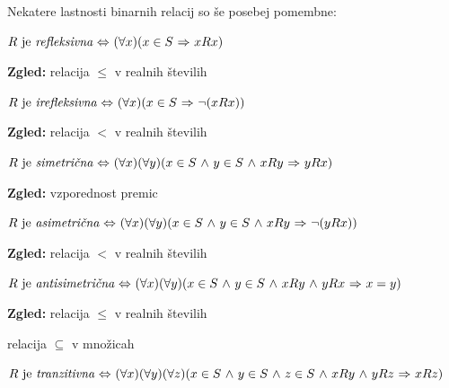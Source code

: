 \documentclass[11pt,paper=b5,DIV=13,headinclude,footinclude]{scrbook}
\def\inn {{~\wedge~}}
\def\sledi {{~\Rightarrow~}}
\def\cee {{~\Leftrightarrow~}}
\begin{document}
Nekatere lastnosti binarnih relacij so še posebej pomembne:

\bigskip

$R \textrm{ je {\em refleksivna}} \cee (\forall x)(x\in S\sledi xRx)$


\textbf{ Zgled:} relacija $\le$ v realnih številih

\bigskip

$R \textrm{ je {\em irefleksivna}} \cee (\forall x)(x\in S\sledi \neg(xRx))$


\textbf{ Zgled:} relacija $<$ v realnih številih

\bigskip

$R \textrm{ je {\em simetrična}} \cee (\forall x)(\forall y)(x\in S\inn y\in S\inn xRy\sledi yRx)$

%
\textbf{ Zgled:} vzporednost premic


\bigskip

$R \textrm{ je {\em asimetrična}} \cee (\forall x)(\forall y)(x\in S\inn y\in S\inn xRy\sledi \neg(yRx))$


\textbf{ Zgled:} relacija $<$ v realnih številih


\bigskip
$R \textrm{ je {\em antisimetrična}} \cee (\forall x)(\forall y)(x\in S\inn y\in S\inn xRy\inn yRx\sledi x = y)$

\textbf{ Zgled:}
relacija $\le$ v realnih številih

relacija $\subseteq$ v množicah

\bigskip

$R \textrm{ je {\em tranzitivna}} \cee (\forall x)(\forall y)(\forall z)(x\in S\inn y\in S\inn z\in S\inn xRy\inn yRz\sledi xRz)$

\end{document}
